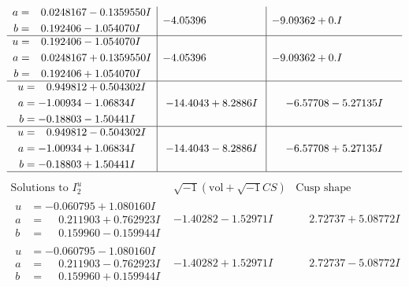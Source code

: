 \documentclass[1p]{elsarticle_modified}
\theoremstyle{definition}
\newcommand{\I}{\sqrt{-1}}
\begin{document}
$$\begin{array}{c|c|c}
\begin{aligned}
a &= \phantom{-}0.0248167 - 0.1359550 I \\
b &= \phantom{-}0.192406 - 1.054070 I\end{aligned}
 & -4.05396\phantom{ +0.000000I} & -9.09362 + 0. I\phantom{ +0.000000I} \\ \hline\begin{aligned}
u &= \phantom{-}0.192406 - 1.054070 I \\
a &= \phantom{-}0.0248167 + 0.1359550 I \\
b &= \phantom{-}0.192406 + 1.054070 I\end{aligned}
 & -4.05396\phantom{ +0.000000I} & -9.09362 + 0. I\phantom{ +0.000000I} \\ \hline\begin{aligned}
u &= \phantom{-}0.949812 + 0.504302 I \\
a &= -1.00934 - 1.06834 I \\
b &= -0.18803 - 1.50441 I\end{aligned}
 & -14.4043 + 8.2886 I & -6.57708 - 5.27135 I \\ \hline\begin{aligned}
u &= \phantom{-}0.949812 - 0.504302 I \\
a &= -1.00934 + 1.06834 I \\
b &= -0.18803 + 1.50441 I\end{aligned}
 & -14.4043 - 8.2886 I & -6.57708 + 5.27135 I\\
 \hline 
 \end{array}$$\newpage$$\begin{array}{c|c|c}  
\text{Solutions to }I^u_{2}& \I (\text{vol} + \sqrt{-1}CS) & \text{Cusp shape}\\
 \hline 
\begin{aligned}
u &= -0.060795 + 1.080160 I \\
a &= \phantom{-}0.211903 + 0.762923 I \\
b &= \phantom{-}0.159960 - 0.159944 I\end{aligned}
 & -1.40282 - 1.52971 I & \phantom{-}2.72737 + 5.08772 I \\ \hline\begin{aligned}
u &= -0.060795 - 1.080160 I \\
a &= \phantom{-}0.211903 - 0.762923 I \\
b &= \phantom{-}0.159960 + 0.159944 I\end{aligned}
 & -1.40282 + 1.52971 I & \phantom{-}2.72737 - 5.08772 I \\ \hline\begin{aligned}

\end{aligned}
\end{array}$$
\end{document}
